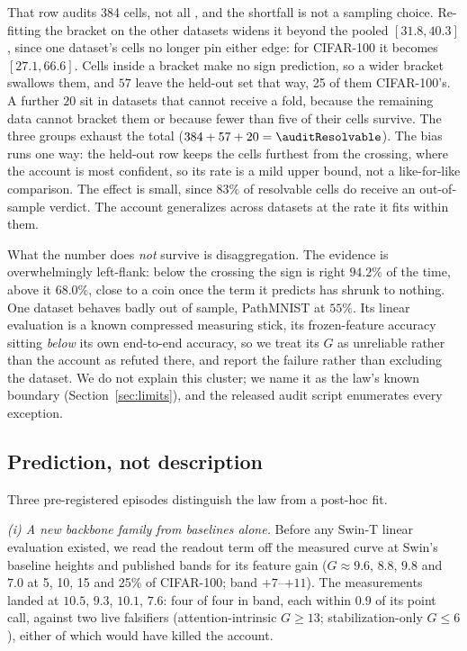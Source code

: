 That row audits 384 cells, not all \auditResolvable{}, and the
shortfall is not a sampling choice. Re-fitting the bracket on the other
datasets widens it beyond the pooled $[31.8, 40.3]$, since one dataset's cells
no longer pin either edge: for CIFAR-100 it becomes $[27.1, 66.6]$. Cells
inside a bracket make no sign prediction, so a wider bracket swallows them,
and $57$ leave the held-out set that way, 25 of them CIFAR-100's. A further
$20$ sit in datasets that cannot receive a fold, because the remaining data
cannot bracket them or because fewer than five of their cells survive. The
three groups exhaust the total ($384 + 57 + 20 = \auditResolvable$). The bias
runs one way: the held-out row keeps the cells furthest from the crossing,
where the account is most confident, so its rate is a mild upper bound, not a like-for-like comparison. The effect is small, since $83\%$ of
resolvable cells do receive an out-of-sample verdict. The account generalizes
across datasets at the rate it fits within them.

What the number does \emph{not} survive is disaggregation. The evidence is
overwhelmingly left-flank: below the crossing the sign is right $94.2\%$ of
the time, above it $68.0\%$, close to a coin once the term it predicts has
shrunk to nothing. One dataset behaves badly out of sample, PathMNIST at
$55\%$. Its linear evaluation is a known compressed measuring stick, its
frozen-feature accuracy sitting \emph{below} its own end-to-end accuracy, so
we treat its $G$ as unreliable rather than the account as refuted there, and
report the failure rather than excluding the dataset. We do not explain this
cluster; we name it as the law's known boundary (Section~\ref{sec:limits}),
and the released audit script enumerates every exception.

\subsection{Prediction, not description}\label{sec:lawpredict}
Three pre-registered episodes distinguish the law from a post-hoc fit.

\emph{(i) A new backbone family from baselines alone.} Before any Swin-T
linear evaluation existed, we read the readout term off the measured curve at Swin's
baseline heights and published bands for its feature gain
($G \approx 9.6$, $8.8$, $9.8$ and $7.0$ at 5, 10, 15 and 25\% of
CIFAR-100; band
$+7$--$+11$). The measurements landed at $10.5$, $9.3$, $10.1$, $7.6$: four of
four in band, each within $0.9$ of its point call, against two live
falsifiers (attention-intrinsic $G{\geq}13$; stabilization-only
$G{\leq}6$), either of which would have killed the account.

